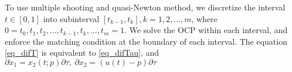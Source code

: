 \documentclass  [
  paper    = a4,
  BCOR     = 10mm,
  twoside,
  fontsize = 12pt,
  fleqn,
  toc      = bibnumbered,
  toc      = listofnumbered,
  numbers  = noendperiod,
  headings = normal,
  listof   = leveldown,
  version  = 3.03
]                                       {scrreprt}
\newcommand{\<}{\langle}
\renewcommand{\>}{\rangle}
\begin{document}
   To use multiple shooting and quasi-Newton method, we discretize the interval $t\in [0,1]$ into subinterval $[t_{k-1}, t_k], k = 1, 2, ..., m$, where $0 =t_0, t_1, t_2, ...,t_{k-1}, t_k, ..., t_m=1$. We solve the OCP within each interval, and enforce the matching condition at the boundary of each interval. 
   The equation \ref{eq_difT} is equivalent to \ref{eq_difTau}, and $\partial x_1= x_2(t;p) \partial \tau, \ \partial x_2 = ( u(t)-p) \partial \tau$
   
   
   
   
   
   
   
\end{document}
